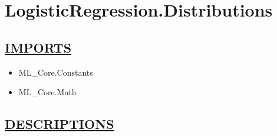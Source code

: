 \chapter*{LogisticRegression.Distributions}
\hypertarget{ecldoc:toc:LogisticRegression.Distributions}{}

\section*{\underline{IMPORTS}}
\begin{itemize}
\item ML\_Core.Constants
\item ML\_Core.Math
\end{itemize}

\section*{\underline{DESCRIPTIONS}}
